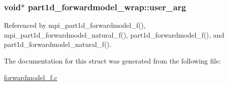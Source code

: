 \subsubsection[{\texorpdfstring{user\+\_\+arg}{user_arg}}]{\setlength{\rightskip}{0pt plus 5cm}void$\ast$ part1d\+\_\+forwardmodel\+\_\+wrap\+::user\+\_\+arg}\hypertarget{structpart1d__forwardmodel__wrap_a06eaf072c527c4e04b24ba613738dfd7}{}\label{structpart1d__forwardmodel__wrap_a06eaf072c527c4e04b24ba613738dfd7}


Referenced by mpi\+\_\+part1d\+\_\+forwardmodel\+\_\+f(), mpi\+\_\+part1d\+\_\+forwardmodel\+\_\+natural\+\_\+f(), part1d\+\_\+forwardmodel\+\_\+f(), and part1d\+\_\+forwardmodel\+\_\+natural\+\_\+f().



The documentation for this struct was generated from the following file\+:\begin{DoxyCompactItemize}
\item 
\hyperlink{forwardmodel__f_8c}{forwardmodel\+\_\+f.\+c}\end{DoxyCompactItemize}
